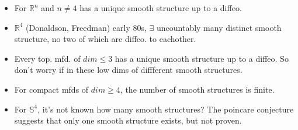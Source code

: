 \documentclass[12pt,letterpaper]{article}
\begin{document}
\begin{itemize}
    \item For $\mathbb{R}^n$ and $n\neq 4$ has a unique smooth structure up to a diffeo.
    \item  $\mathbb{R}^4$ (Donaldson, Freedman) early 80s, $\exists$ uncountably many distinct smooth structure, no two of which are diffeo. to eachother.
    \item Every top. mfd. of $dim \leq 3$ has a unique smooth structure up to a diffeo. So don't worry if in these low dims of diffferent smooth structures. 
    \item For compact mfds of $dim \geq 4$, the number of smooth structures is finite.
    \item For $\mathbb{S}^4$, it's not known how many smooth structures? The poincare conjecture suggests that only one smooth structure exists, but not proven.
\end{itemize}
\end{document}
